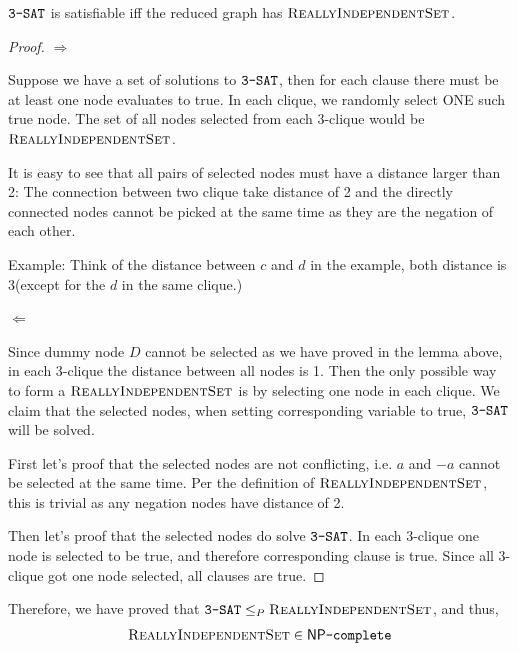 \begin{theorem}
    $\texttt{3-SAT}$ is satisfiable iff the reduced graph has $\textsc{ReallyIndependentSet}$.
\end{theorem}

\begin{proof}
    $\Rightarrow$
    
    Suppose we have a set of solutions to $\texttt{3-SAT}$, then for each clause there must be at least one node evaluates to true.
    In each clique, we randomly select ONE such true node. The set of all nodes selected from each 3-clique would be $\textsc{ReallyIndependentSet}$.

    It is easy to see that all pairs of selected nodes must have a distance larger than 2: The connection between two clique take distance of 2 and the directly connected nodes cannot be picked at the same time as they are the negation of each other.

    Example: Think of the distance between $c$ and $d$ in the example, both distance is 3(except for the $d$ in the same clique.)

    $\Leftarrow$

    Since dummy node $D$ cannot be selected as we have proved in the lemma above, in each 3-clique the distance between all nodes is 1. 
    Then the only possible way to form a $\textsc{ReallyIndependentSet}$ is by selecting one node in each clique.
    We claim that the selected nodes, when setting corresponding variable to true, $\texttt{3-SAT}$ will be solved.

    First let's proof that the selected nodes are not conflicting, i.e. $a$ and $-a$ cannot be selected at the same time.
    Per the definition of $\textsc{ReallyIndependentSet}$, this is trivial as any negation nodes have distance of 2.

    Then let's proof that the selected nodes do solve $\texttt{3-SAT}$.
    In each 3-clique one node is selected to be true, and therefore corresponding clause is true. 
    Since all 3-clique got one node selected, all clauses are true.
\end{proof}

Therefore, we have proved  that $\texttt{3-SAT} \le_P \textsc{ReallyIndependentSet}$, and thus, $$\textsc{ReallyIndependentSet} \in \mathsf{NP}\texttt{-complete}$$


